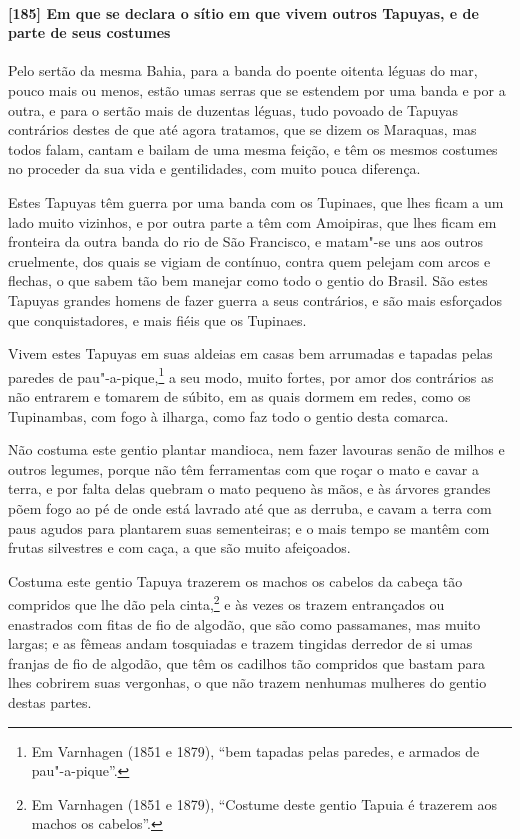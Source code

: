 \begin{linenumbers}
\paragraph{[185] Em que se declara o sítio em que vivem outros Tapuyas, e de parte de seus
costumes}\quad
Pelo sertão da mesma Bahia, para a banda do poente oitenta léguas do mar, pouco mais ou
menos, estão umas serras que se estendem por uma banda e por a outra, e para o sertão mais
de duzentas léguas, tudo povoado de Tapuyas contrários destes de que até agora tratamos,
que se dizem os Maraquas, mas todos falam, cantam e bailam de uma mesma feição, e têm os
mesmos costumes no proceder da sua vida e gentilidades, com muito pouca diferença.

Estes Tapuyas têm guerra por uma banda com os Tupinaes, que lhes ficam a um lado muito
vizinhos, e por outra parte a têm com Amoipiras, que lhes ficam em fronteira da outra
banda do rio de São Francisco, e matam"-se uns aos outros cruelmente, dos quais se vigiam
de contínuo, contra quem pelejam com arcos e flechas, o que sabem tão bem manejar como
todo o gentio do Brasil. São estes Tapuyas grandes homens de fazer guerra a seus
contrários, e são mais esforçados que conquistadores, e mais fiéis que os Tupinaes.

Vivem estes Tapuyas em suas aldeias em casas bem arrumadas e tapadas pelas paredes de
pau"-a-pique,\footnote{ Em Varnhagen (1851 e 1879), ``bem tapadas pelas paredes, e armados
de pau"-a-pique''.} a seu modo, muito fortes, por amor dos contrários as não entrarem e
tomarem de súbito, em as quais dormem em redes, como os Tupinambas, com fogo à ilharga,
como faz todo o gentio desta comarca.

Não costuma este gentio plantar mandioca, nem fazer lavouras senão de milhos e outros
legumes, porque não têm ferramentas com que roçar o mato e cavar a terra, e por falta
delas quebram o mato pequeno às mãos, e às árvores grandes põem fogo ao pé de onde está
lavrado até que as derruba, e cavam a terra com paus agudos para plantarem suas
sementeiras; e o mais tempo se mantêm com frutas silvestres e com caça, a que são muito
afeiçoados.

Costuma este gentio Tapuya trazerem os machos os cabelos da cabeça tão compridos que lhe
dão pela cinta,\footnote{ Em Varnhagen (1851 e 1879), ``Costume deste gentio Tapuia é
trazerem aos machos os cabelos''.} e às vezes os trazem entrançados ou enastrados com
fitas de fio de algodão, que são como passamanes, mas muito largas; e as fêmeas andam
tosquiadas e trazem tingidas derredor de si umas franjas de fio de algodão, que têm os
cadilhos tão compridos que bastam para lhes cobrirem suas vergonhas, o que não trazem
nenhumas mulheres do gentio destas partes.


\end{linenumbers}
